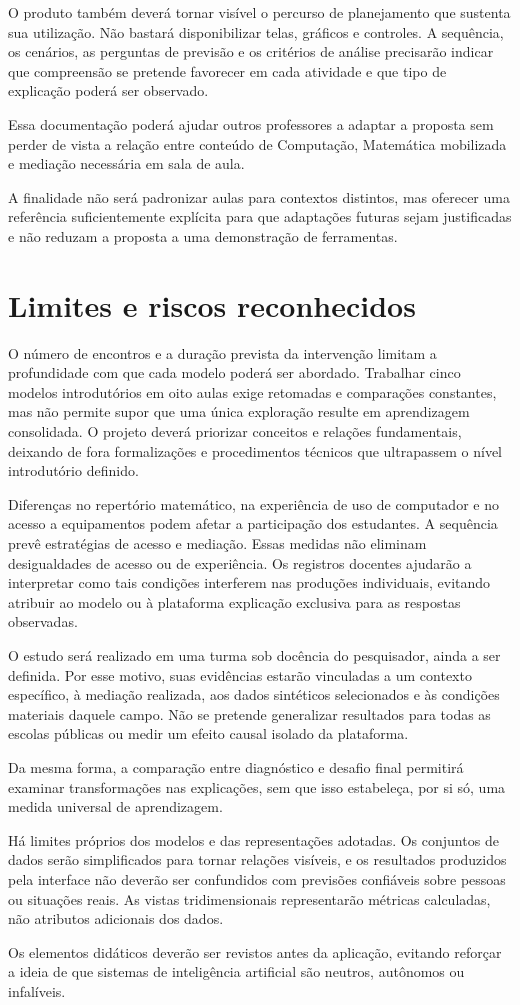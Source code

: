 O produto também deverá tornar visível o percurso de planejamento que sustenta sua utilização. Não bastará disponibilizar telas, gráficos e controles. A sequência, os cenários, as perguntas de previsão e os critérios de análise precisarão indicar que compreensão se pretende favorecer em cada atividade e que tipo de explicação poderá ser observado.

Essa documentação poderá ajudar outros professores a adaptar a proposta sem perder de vista a relação entre conteúdo de Computação, Matemática mobilizada e mediação necessária em sala de aula.

A finalidade não será padronizar aulas para contextos distintos, mas oferecer uma referência suficientemente explícita para que adaptações futuras sejam justificadas e não reduzam a proposta a uma demonstração de ferramentas.

\section{Limites e riscos reconhecidos}

O número de encontros e a duração prevista da intervenção limitam a profundidade com que cada modelo poderá ser abordado. Trabalhar cinco modelos introdutórios em oito aulas exige retomadas e comparações constantes, mas não permite supor que uma única exploração resulte em aprendizagem consolidada. O projeto deverá priorizar conceitos e relações fundamentais, deixando de fora formalizações e procedimentos técnicos que ultrapassem o nível introdutório definido.

Diferenças no repertório matemático, na experiência de uso de computador e no acesso a equipamentos podem afetar a participação dos estudantes. A sequência prevê estratégias de acesso e mediação. Essas medidas não eliminam desigualdades de acesso ou de experiência. Os registros docentes ajudarão a interpretar como tais condições interferem nas produções individuais, evitando atribuir ao modelo ou à plataforma explicação exclusiva para as respostas observadas.

O estudo será realizado em uma turma sob docência do pesquisador, ainda a ser definida. Por esse motivo, suas evidências estarão vinculadas a um contexto específico, à mediação realizada, aos dados sintéticos selecionados e às condições materiais daquele campo. Não se pretende generalizar resultados para todas as escolas públicas ou medir um efeito causal isolado da plataforma.

Da mesma forma, a comparação entre diagnóstico e desafio final permitirá examinar transformações nas explicações, sem que isso estabeleça, por si só, uma medida universal de aprendizagem.

Há limites próprios dos modelos e das representações adotadas. Os conjuntos de dados serão simplificados para tornar relações visíveis, e os resultados produzidos pela interface não deverão ser confundidos com previsões confiáveis sobre pessoas ou situações reais. As vistas tridimensionais representarão métricas calculadas, não atributos adicionais dos dados.

Os elementos didáticos deverão ser revistos antes da aplicação, evitando reforçar a ideia de que sistemas de inteligência artificial são neutros, autônomos ou infalíveis.
